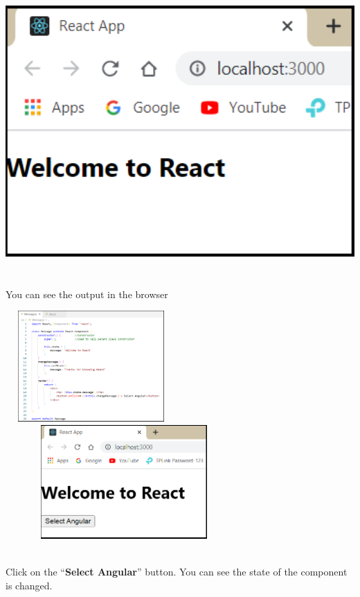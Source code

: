 \documentclass{article}
\begin{document}
\begin{center}
	\noindent \includegraphics*[width=5.85in, height=3.90in]{IMG-09-30}
\end{center}

\noindent 

\noindent \\
You can see the output in the browser

\begin{center}
	\noindent \includegraphics*[width=2.57in, height=1.67in]{IMG-09-31} \includegraphics*[width=3.56in, height=1.71in]{IMG-09-32}
\end{center}

\noindent 

\noindent \\
Click on the ``\textbf{Select Angular}'' button.    You can see the state of the component is changed.
\end{document}
